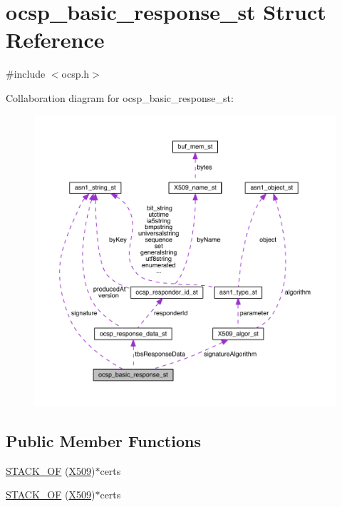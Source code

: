 \hypertarget{structocsp__basic__response__st}{}\section{ocsp\+\_\+basic\+\_\+response\+\_\+st Struct Reference}
\label{structocsp__basic__response__st}


{\ttfamily \#include $<$ocsp.\+h$>$}



Collaboration diagram for ocsp\+\_\+basic\+\_\+response\+\_\+st\+:\nopagebreak
\begin{figure}[H]
\begin{center}
\leavevmode
\includegraphics[width=350pt]{structocsp__basic__response__st__coll__graph}
\end{center}
\end{figure}
\subsection*{Public Member Functions}
\begin{DoxyCompactItemize}
\item 
\hyperlink{structocsp__basic__response__st_a51f0ddafb33cce3c0ce72817d32f1baa}{S\+T\+A\+C\+K\+\_\+\+OF} (\hyperlink{crypto_2ossl__typ_8h_a4f666bde6518f95deb3050c54b408416}{X509})$\ast$certs
\item 
\hyperlink{structocsp__basic__response__st_a51f0ddafb33cce3c0ce72817d32f1baa}{S\+T\+A\+C\+K\+\_\+\+OF} (\hyperlink{crypto_2ossl__typ_8h_a4f666bde6518f95deb3050c54b408416}{X509})$\ast$certs
\end{DoxyCompactItemize}
